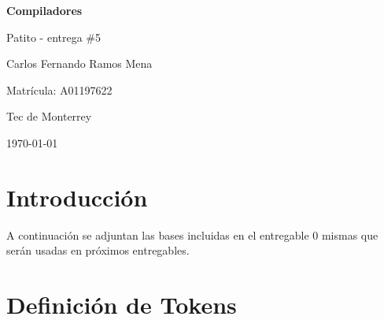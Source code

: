 \documentclass[12pt, letterpaper]{article}
\theoremstyle{definition}
\begin{document}
\begin{titlepage}
    \centering
    \vspace*{2cm}
    {\LARGE\bfseries Compiladores\par}
    \vspace{0.5cm}
    {\large Patito - entrega \#5 \par}
    \vspace{2cm}
    {\large Carlos Fernando Ramos Mena\par}
    \vspace{0.3cm}
    {\normalsize Matrícula: A01197622\par}
    \vspace{0.5cm}
    {\normalsize Tec de Monterrey\par}
    \vfill
    {\normalsize \today\par}
\end{titlepage}


\section{Introducción}
A continuación se adjuntan las bases incluidas en el entregable 0 mismas que serán usadas en próximos entregables.


\section{Definición de Tokens }
\end{document}
